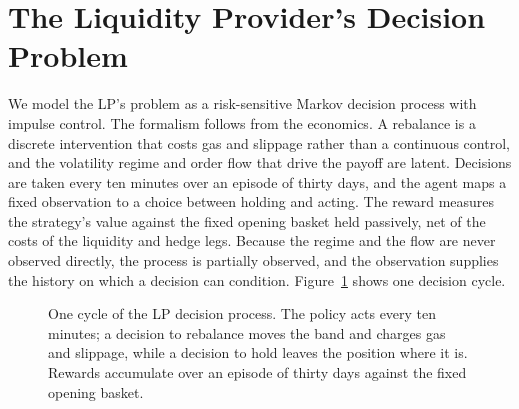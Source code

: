 \section{The Liquidity Provider's Decision Problem}
\label{sec:formulation}

We model the LP's problem as a risk-sensitive Markov decision process with
impulse control. The formalism follows from the economics. A rebalance is a
discrete intervention that costs gas and slippage rather than a continuous
control, and the volatility regime and order flow that drive the payoff are
latent. Decisions are taken every ten minutes over an episode of thirty days,
and the agent maps a fixed observation to a choice between holding and acting.
The reward measures the strategy's value against the fixed opening basket held
passively, net of the costs of the liquidity and hedge legs. Because the regime
and the flow are never observed directly, the process is partially observed,
and the observation supplies the history on which a decision can condition.
Figure~\ref{fig:loop} shows one decision cycle.

\begin{figure}[tbp]
\centering
{}
\caption{One cycle of the LP decision process. The policy acts every ten
minutes; a decision to rebalance moves the band and charges gas and slippage,
while a decision to hold leaves the position where it is. Rewards accumulate
over an episode of thirty days against the fixed opening basket.}
\label{fig:loop}
\end{figure}

